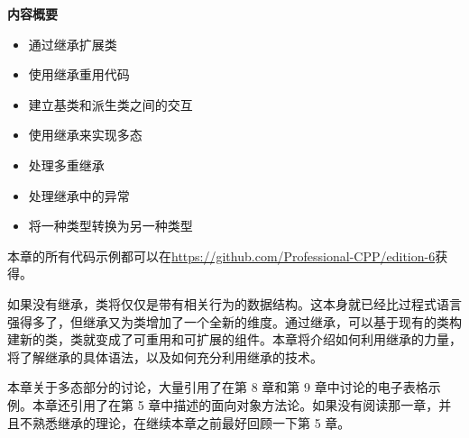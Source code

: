 \noindent
\textbf{内容概要}

\begin{itemize}
\item
通过继承扩展类

\item
使用继承重用代码

\item
建立基类和派生类之间的交互

\item
使用继承来实现多态

\item
处理多重继承

\item
处理继承中的异常

\item
将一种类型转换为另一种类型
\end{itemize}

本章的所有代码示例都可以在\url{https://github.com/Professional-CPP/edition-6}获得。

如果没有继承，类将仅仅是带有相关行为的数据结构。这本身就已经比过程式语言强得多了，但继承又为类增加了一个全新的维度。通过继承，可以基于现有的类构建新的类，类就变成了可重用和可扩展的组件。本章将介绍如何利用继承的力量，将了解继承的具体语法，以及如何充分利用继承的技术。

本章关于多态部分的讨论，大量引用了在第 8 章和第 9 章中讨论的电子表格示例。本章还引用了在第 5 章中描述的面向对象方法论。如果没有阅读那一章，并且不熟悉继承的理论，在继续本章之前最好回顾一下第 5 章。






























